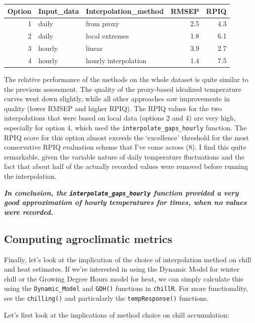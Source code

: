 \documentclass[
]{book}
\begin{document}
\begingroup\fontsize{10}{12}\selectfont

\begin{tabular}{r|l|l|r|r}
\hline
Option & Input\_data & Interpolation\_method & RMSEP & RPIQ\\
\hline
1 & daily & from proxy & 2.5 & 4.3\\
\hline
2 & daily & local extremes & 1.8 & 6.1\\
\hline
3 & hourly & linear & 3.9 & 2.7\\
\hline
4 & hourly & hourly interpolation & 1.4 & 7.5\\
\hline
\end{tabular}
\endgroup{}

The relative performance of the methods on the whole dataset is quite similar to the previous assessment. The quality of the proxy-based idealized temperature curves went down slightly, while all other approaches saw improvements in quality (lower RMSEP and higher RPIQ). The RPIQ values for the two interpolations that were based on local data (options 2 and 4) are very high, especially for option 4, which used the \texttt{interpolate\_gaps\_hourly} function. The RPIQ score for this option almost exceeds the `excellence' threshold for the most conservative RPIQ evaluation scheme that I've come across (8). I find this quite remarkable, given the variable nature of daily temperature fluctuations and the fact that about half of the actually recorded values were removed before running the interpolation.

\textbf{\emph{In conclusion, the \texttt{interpolate\_gaps\_hourly} function provided a very good approximation of hourly temperatures for times, when no values were recorded.}}

\hypertarget{computing-agroclimatic-metrics}{%
\subsection{Computing agroclimatic metrics}\label{computing-agroclimatic-metrics}}

Finally, let's look at the implication of the choice of interpolation method on chill and heat estimates. If we're interested in using the Dynamic Model for winter chill or the Growing Degree Hours model for heat, we can simply calculate this using the \texttt{Dynamic\_Model} and \texttt{GDH()} functions in \texttt{chillR}. For more functionality, see the \texttt{chilling()} and particularly the \texttt{tempResponse()} functions.

Let's first look at the implications of method choice on chill accumulation:
\end{document}
